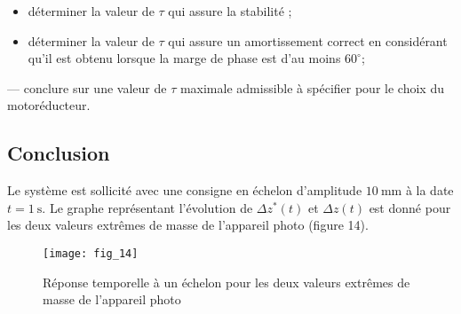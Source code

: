 \ifprof
\begin{corrige}
\end{corrige}
\else
\fi

\ifprof
\begin{corrige}
\end{corrige}
\else
\fi
\begin{itemize}
  \item déterminer la valeur de $\tau$ qui assure la stabilité ;
  \item déterminer la valeur de $\tau$ qui assure un amortissement correct en considérant qu'il est obtenu lorsque la marge de phase est d'au moins $60^{\circ}$;
\end{itemize}

— conclure sur une valeur de $\tau$ maximale admissible à spécifier pour le choix du motoréducteur.

\subsection{Conclusion}
Le système est sollicité avec une consigne en échelon d'amplitude $10 \mathrm{~mm}$ à la date $t=1 \mathrm{~s}$. Le graphe représentant l'évolution de $\Delta z^{*}(t)$ et $\Delta z(t)$ est donné pour les deux valeurs extrêmes de masse de l'appareil photo (figure 14).

\begin{figure}[H]
\centering
\texttt{[image: fig\_14]}
\caption{\label{fig:14}  Réponse temporelle à un échelon pour les deux valeurs extrêmes de masse de l'appareil photo}
\end{figure}

\ifprof
\begin{corrige}
\end{corrige}
\else
\fi

